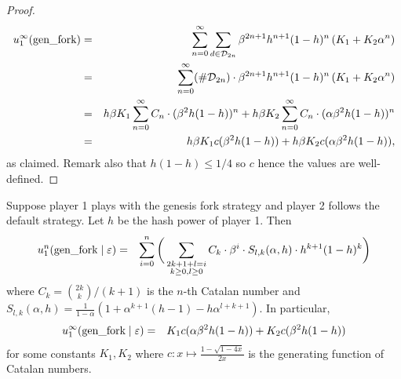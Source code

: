 \begin{proof}
\begin{eqnarray*}
	u^\infty_1(\text{\rm gen\_fork}) &=& \sum_{n=0}^{\infty}\sum_{d\in \mathcal{D}_{2n}}\beta^{2n+1}h^{n+1}(1-h)^{n}\left(K_1+K_2\alpha^{n}\right)\\
	&=& \sum_{n=0}^{\infty}(\#  \mathcal{D}_{2n})\cdot\beta^{2n+1}h^{n+1}(1-h)^{n}\left(K_1+K_2\alpha^{n}\right)\\
	&=& h\beta K_1\sum_{n=0}^{\infty}C_n\cdot (\beta^{2}h(1-h))^{n} + h\beta K_2\sum_{n=0}^{\infty}C_n\cdot (\alpha\beta^{2}h(1-h))^{n}\\
    &=& h\beta K_1c(\beta^2 h(1-h)) + h\beta K_2c(\alpha \beta^2 h(1-h)),
\end{eqnarray*}
as claimed. Remark also that $h(1-h)\leq 1/4$ so $c$ hence the values are well-defined. \end{proof}

\begin{myprop*}
Suppose player 1 plays with the genesis fork strategy and player 2 follows the default strategy. Let $h$ be the hash power of player 1. Then
\begin{eqnarray*}
	u_1^n(\text{\rm gen\_fork} \mid \varepsilon) & = & \sum_{i=0}^{n} \bigg( \sum_{\substack{2k+1+l=i\\k\geq 0,l\geq 0}} C_k\cdot \beta^{i} \cdot S_{l,k}(\alpha,h)\cdot h^{k+1}(1-h)^{k} \bigg)
\end{eqnarray*}
where $C_k={2k\choose k}/(k+1)$ is the $n$-th Catalan number and $S_{l,k}(\alpha,h)=\frac{1}{1-\alpha}(1+\alpha^{k+1}(h-1)-h\alpha^{l+k+1})$. In particular,
\begin{eqnarray*}
	u_1^\infty(\text{\rm gen\_fork} \mid \varepsilon) & = & K_1 c(\alpha\beta^2h(1-h))+K_2 c(\beta^2h(1-h))
\end{eqnarray*}
for some constants $K_1,K_2$ where $c:x\mapsto \frac{1-\sqrt{1-4x}}{2x}$ is the generating function of Catalan numbers.

\end{myprop*}
